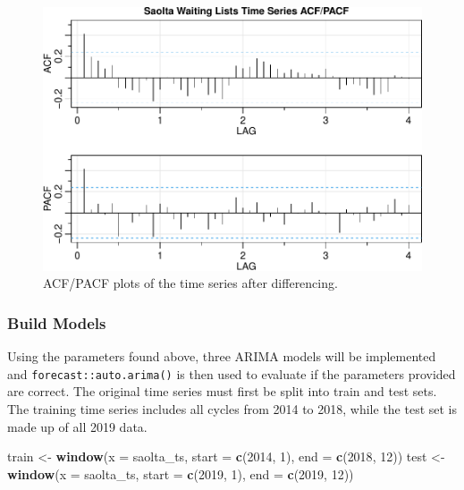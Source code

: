 \documentclass[
  12pt,
]{article}
\newenvironment{Shaded}{\begin{snugshade}}{\end{snugshade}}
\newcommand{\DataTypeTok}[1]{\textcolor[rgb]{0.13,0.29,0.53}{#1}}
\newcommand{\DecValTok}[1]{\textcolor[rgb]{0.00,0.00,0.81}{#1}}
\newcommand{\KeywordTok}[1]{\textcolor[rgb]{0.13,0.29,0.53}{\textbf{#1}}}
\newcommand{\NormalTok}[1]{#1}
\newcommand{\StringTok}[1]{\textcolor[rgb]{0.31,0.60,0.02}{#1}}
\begin{document}
\begin{figure}

{\centering \includegraphics[width=0.8\linewidth]{data_science_ca4_files/figure-latex/acf-diffed-1} 

}

\caption{ACF/PACF plots of the time series after differencing.}\label{fig:acf-diffed}
\end{figure}

\hypertarget{build-models}{%
\subsubsection{Build Models}\label{build-models}}

Using the parameters found above, three ARIMA models will be implemented and \texttt{forecast::auto.arima()} is then used to evaluate if the parameters provided are correct. The original time series must first be split into train and test sets. The training time series includes all cycles from 2014 to 2018, while the test set is made up of all 2019 data.
\small

\begin{Shaded}
\begin{Highlighting}[]
\NormalTok{train \textless{}{-}}\StringTok{ }\KeywordTok{window}\NormalTok{(}\DataTypeTok{x =}\NormalTok{ saolta\_ts, }\DataTypeTok{start =} \KeywordTok{c}\NormalTok{(}\DecValTok{2014}\NormalTok{, }\DecValTok{1}\NormalTok{), }\DataTypeTok{end =} \KeywordTok{c}\NormalTok{(}\DecValTok{2018}\NormalTok{, }\DecValTok{12}\NormalTok{))}
\NormalTok{test \textless{}{-}}\StringTok{ }\KeywordTok{window}\NormalTok{(}\DataTypeTok{x =}\NormalTok{ saolta\_ts, }\DataTypeTok{start =} \KeywordTok{c}\NormalTok{(}\DecValTok{2019}\NormalTok{, }\DecValTok{1}\NormalTok{), }\DataTypeTok{end =} \KeywordTok{c}\NormalTok{(}\DecValTok{2019}\NormalTok{, }\DecValTok{12}\NormalTok{))}
\end{Highlighting}
\end{Shaded}
\end{document}
